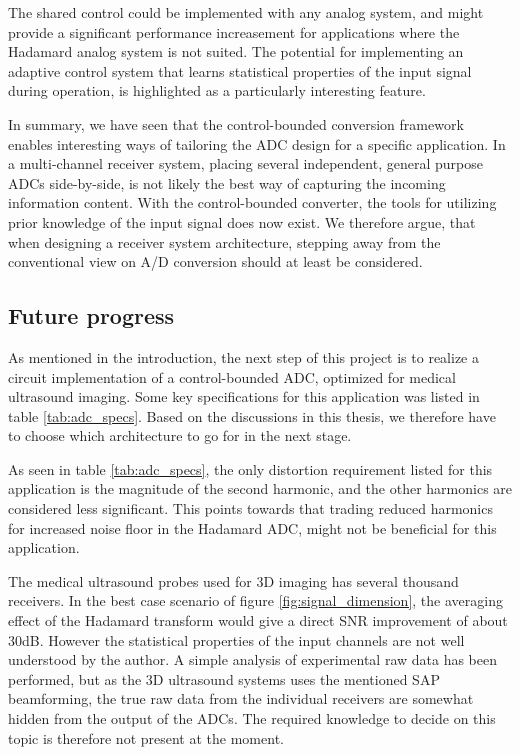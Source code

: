 The shared control could be implemented with any analog system, and might provide a significant performance increasement for applications where the Hadamard analog system is not suited. The potential for implementing an adaptive control system that learns statistical properties of the input signal during operation, is highlighted as a particularly interesting feature.

In summary, we have seen that the control-bounded conversion framework enables interesting ways of tailoring the ADC design for a specific application. In a multi-channel receiver system, placing several independent, general purpose ADCs side-by-side, is not likely the best way of capturing the incoming information content. With the control-bounded converter, the tools for utilizing prior knowledge of the input signal does now exist. We therefore argue, that when designing a receiver system architecture, stepping away from the conventional view on A/D conversion should at least be considered.


\subsection*{Future progress}
As mentioned in the introduction, the next step of this project is to realize a circuit implementation of a control-bounded ADC, optimized for medical ultrasound imaging. Some key specifications for this application was listed in table \ref{tab:adc_specs}. Based on the discussions in this thesis, we therefore have to choose which architecture to go for in the next stage.

As seen in table \ref{tab:adc_specs}, the only distortion requirement listed for this application is the magnitude of the second harmonic, and the other harmonics are considered less significant. This points towards that trading reduced harmonics for increased noise floor in the Hadamard ADC, might not be beneficial for this application.

The medical ultrasound probes used for 3D imaging has several thousand receivers. In the best case scenario of figure \ref{fig:signal_dimension}, the averaging effect of the Hadamard transform would give a direct SNR improvement of about 30dB. However the statistical properties of the input channels are not well understood by the author. A simple analysis of experimental raw data has been performed, but as the 3D ultrasound systems uses the mentioned SAP beamforming, the true raw data from the individual receivers are somewhat hidden from the output of the ADCs. The required knowledge to decide on this topic is therefore not present at the moment.

